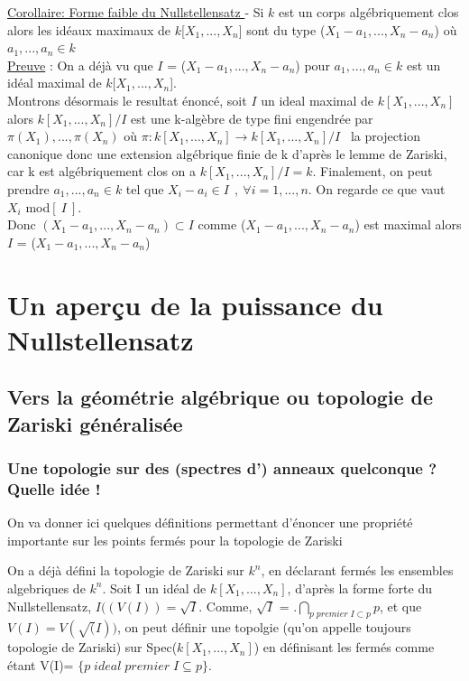 \documentclass[10pt, twoside]{article}
\theoremstyle{plain}
\theoremstyle{definition}
\theoremstyle{plain}
\theoremstyle{plain}
\theoremstyle{definition}
\theoremstyle{remark}
\begin{document}
\underline{Corollaire: Forme faible du Nullstellensatz } - 
Si $k$ est un corps algébriquement clos alors les idéaux maximaux de $k$[$X_{1},...,X_{n}$] sont du type ($X_{1} - a_{1}, ... ,  X_{n} - a_{n}$) où $a_{1},..., a_{n} \in  k $
\\
\underline{Preuve} : On a déjà vu que  $I$ = ($X_{1} - a_{1}, ... ,  X_{n} - a_{n}$) pour $a_{1},..., a_{n} \in  k $ est un idéal maximal de $ k$[$X_{1},...,X_{n}$].
\\ Montrons désormais le resultat énoncé, soit $I$ un ideal maximal de $k[X_{1},...,X_{n}]$ alors  $k[X_{1},...,X_{n}]/I$ est une k-algèbre de type fini engendrée par $ \pi(X_{1}),...,\pi(X_{n})$ où $ \pi : k[X_{1},...,X_{n}] \longrightarrow k[X_{1},...,X_{n}]/I $ \  la projection canonique donc une extension algébrique finie de k d'après le lemme de Zariski, car k est algébriquement clos on a $k[X_{1},...,X_{n}]/I = k $. Finalement, on peut prendre $a_{1},..., a_{n} \in  k $ tel que $X_{i} - a_{i} \in I\ \ , \ \forall i = {1, ... , n} $. On regarde ce que vaut $X_{i} $ mod$[\ I\ ]$.  \\ Donc $(X_{1} - a_{1}, ... ,  X_{n} - a_{n}) \subset I $ comme ($X_{1} - a_{1}, ... ,  X_{n} - a_{n}$) est maximal alors $I$ = ($X_{1} - a_{1}, ... ,  X_{n} - a_{n}$)

\section{Un aperçu de la puissance du Nullstellensatz}

\subsection{Vers la géométrie algébrique ou topologie de Zariski généralisée}

\subsubsection{Une topologie sur des (spectres d') anneaux quelconque ? Quelle idée !}

On va donner ici quelques définitions permettant d'énoncer une propriété importante sur les points fermés pour la topologie de Zariski

On a déjà défini la topologie de Zariski sur $k^n$, en déclarant fermés les ensembles algebriques de $k^n$.
Soit I un idéal de $k[X_{1},...,X_{n}]$, d'après la forme forte du Nullstellensatz, $I((V(I)) = \sqrt{I}$. Comme, $\sqrt{I}$ = .$\bigcap_{p  \; premier \; I \subset p} p $, et que $V(I)= V(\sqrt(I))$, on peut définir une topolgie (qu'on appelle toujours topologie de Zariski) sur Spec($k[X_{1},...,X_{n}]$) en définisant les fermés comme étant V(I)= $\{ p  \; ideal \; premier \; I \subseteq p \}$.
\end{document}
